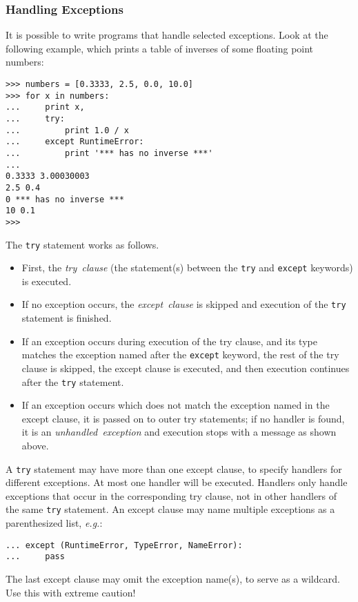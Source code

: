 \subsubsection{Handling Exceptions}

It is possible to write programs that handle selected exceptions.
Look at the following example, which prints a table of inverses of
some floating point numbers:
\begin{code}\begin{verbatim}
>>> numbers = [0.3333, 2.5, 0.0, 10.0]
>>> for x in numbers:
...     print x,
...     try:
...         print 1.0 / x
...     except RuntimeError:
...         print '*** has no inverse ***'
... 
0.3333 3.00030003
2.5 0.4
0 *** has no inverse ***
10 0.1
>>> 
\end{verbatim}\end{code}
The {\tt try} statement works as follows.
\begin{itemize}
\item
First, the
{\it try\ clause}
(the statement(s) between the {\tt try} and {\tt except} keywords) is
executed.
\item
If no exception occurs, the
{\it except\ clause}
is skipped and execution of the {\tt try} statement is finished.
\item
If an exception occurs during execution of the try clause, and its
type matches the exception named after the {\tt except} keyword, the
rest of the try clause is skipped, the except clause is executed, and
then execution continues after the {\tt try} statement.
\item
If an exception occurs which does not match the exception named in the
except clause, it is passed on to outer try statements; if no handler is
found, it is an
{\it unhandled\ exception}
and execution stops with a message as shown above.
\end{itemize}
A {\tt try} statement may have more than one except clause, to specify
handlers for different exceptions.
At most one handler will be executed.
Handlers only handle exceptions that occur in the corresponding try
clause, not in other handlers of the same {\tt try} statement.
An except clause may name multiple exceptions as a parenthesized list,
{\it e.g.}:
\begin{code}\begin{verbatim}
... except (RuntimeError, TypeError, NameError):
...     pass
\end{verbatim}\end{code}
The last except clause may omit the exception name(s), to serve as a
wildcard.
Use this with extreme caution!

